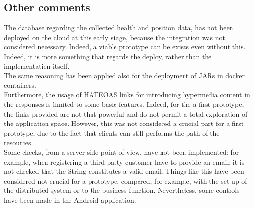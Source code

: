 \subsection{Other comments}
The database regarding the collected health and position data, has not been deployed on the cloud at this
early stage, because the integration was not considered necessary. Indeed, a viable prototype can be 
exists even without this. Indeed, it is more something that regards the deploy, rather than the 
implementation itself. \\
The same reasoning has been applied also for the deployment of JARs in docker containers. \\
Furthermore, the usage of HATEOAS links for introducing hypermedia content in the responses is limited to some basic features. 
Indeed, for the a first prototype, the links provided are not that powerful and do not permit a total exploration of the application space.
However, this was not considered a crucial part for a first prototype, due to the fact that clients can still performs the path of the
resources.  \\
Some checks, from a server side point of view, have not been implemented: for example, when registering a third party customer have to
provide an email: it is not checked that the String constitutes a valid email. Things like this have been considered not crucial 
for a prototype, compered, for example, with the set up of the distributed system or to the business function.
Nevertheless, some controls have been made in the Android application. \\
